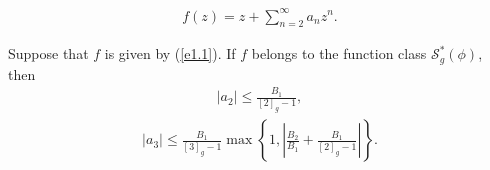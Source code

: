 \documentclass[10pt,a4paper]{amsart}
\begin{document}
\begin{align}\label{e1.1}
f(z)=z+\sum^{\infty}_{n=2}a_{n}z^{n}.
\end{align}

\begin{theorem}
Suppose that $f$ is given by (\ref{e1.1}). If $f$ belongs to the function class $\mathcal{S}^{\ast }_{g}(\phi)$, then
\begin{align}
\mid a_{2}\mid \leq \frac{B_{1}}{[2]_{g}-1}\nonumber,
\end{align}
\begin{align}\nonumber
\mid a_{3}\mid \leq\frac{B_{1}}{[3]_{g}-1}\max\left\{1, \left|\frac{B_{2}}{B_{1}}+\frac{B_{1}}{[2]_{g}-1}\right|\right\}.\nonumber
\end{align}
\end{theorem}
\end{document}
